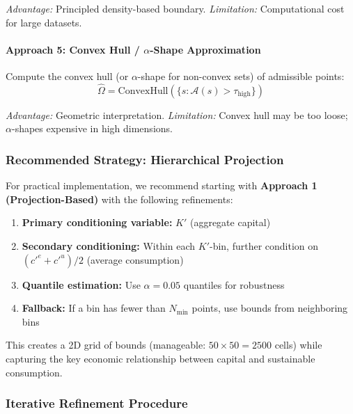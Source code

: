 \textit{Advantage:} Principled density-based boundary.
\textit{Limitation:} Computational cost for large datasets.

\paragraph{Approach 5: Convex Hull / $\alpha$-Shape Approximation}

Compute the convex hull (or $\alpha$-shape for non-convex sets) of admissible points:
\begin{equation}
    \hat{\Omega} = \text{ConvexHull}(\{s : \mathcal{A}(s) > \tau_{\text{high}}\})
\end{equation}

\textit{Advantage:} Geometric interpretation.
\textit{Limitation:} Convex hull may be too loose; $\alpha$-shapes expensive in high dimensions.

\subsubsection{Recommended Strategy: Hierarchical Projection}

For practical implementation, we recommend starting with \textbf{Approach 1 (Projection-Based)} with the following refinements:

\begin{enumerate}
    \item \textbf{Primary conditioning variable:} $K'$ (aggregate capital)
    \item \textbf{Secondary conditioning:} Within each $K'$-bin, further condition on $(c'^e + c'^u)/2$ (average consumption)
    \item \textbf{Quantile estimation:} Use $\alpha = 0.05$ quantiles for robustness
    \item \textbf{Fallback:} If a bin has fewer than $N_{\min}$ points, use bounds from neighboring bins
\end{enumerate}

This creates a 2D grid of bounds (manageable: $50 \times 50 = 2500$ cells) while capturing the key economic relationship between capital and sustainable consumption.

\subsubsection{Iterative Refinement Procedure}

